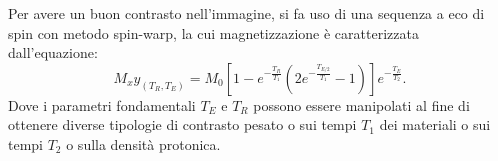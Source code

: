 Per avere un buon contrasto nell'immagine, si fa uso di una sequenza a eco di spin con metodo spin-warp, la cui magnetizzazione è caratterizzata dall'equazione:
\begin{equation}
	{M_xy}_{(T_R,T_E)} = M_0[1-e^{-\frac{T_R}{T_1}}(2e^{-\frac{T_{E/2}}{T_1}}-1)]e^{-\frac{T_E}{T_2}} .
\label{fm:sw}
\end{equation}
Dove i parametri fondamentali $T_E$ e $T_R$ possono essere manipolati al fine di ottenere diverse tipologie di contrasto pesato o sui tempi $T_1$ dei materiali o sui tempi $T_2$ o sulla densità protonica.%

